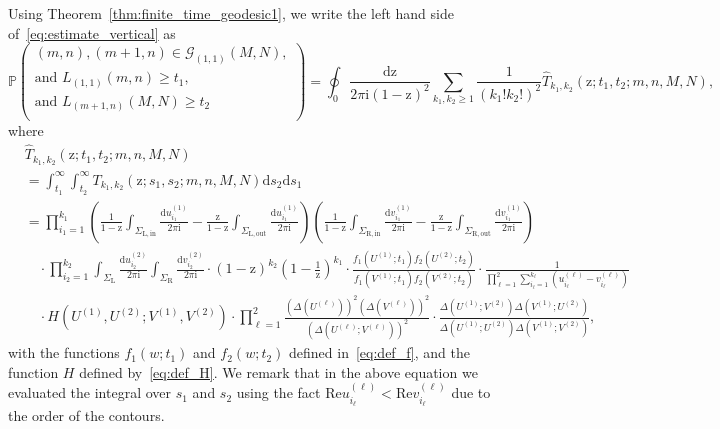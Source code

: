 \documentclass{article}
\numberwithin{equation}{section}
\newcommand{\ddbar}[2]{\frac{{\mathrm d}#1}{2\pi {\mathrm i}#2}}
\newcommand{\gd}{{\mathcal{G}}}
\newcommand{\inn}{\mathrm{in}}
\newcommand{\LL}{\mathrm{L}}
\newcommand{\out}{\mathrm{out}}
\newcommand{\prob}{\mathbb{P}}
\newcommand{\RR}{\mathrm{R}}
\begin{document}
Using Theorem~\ref{thm:finite_time_geodesic1}, we write the left hand side of~\eqref{eq:estimate_vertical} as
\begin{equation}
	\label{eq:left_vertical}
	\prob
	\left(
	\begin{array}{l}
		(m,n), (m+1,n)\in \gd_{(1,1)}{(M,N)},\\
		\mbox{and }L_{(1,1)}(m,n)\ge t_1, \\
		\mbox{and } L_{(m+1,n)}(M,N)\ge t_2\\
	\end{array}
	\right)=\oint_0\ddbar{\mathrm{z}}{\mathrm{(1-z)^2}}\sum_{k_1,k_2\ge 1}
	\frac{1}{(k_1!k_2!)^2}
	\hat T_{k_1,k_2}(\mathrm{z};t_1,t_2;m,n,M,N),
\end{equation}
where
\begin{equation}
	\label{eq:hat_T}
	\begin{split}
	&\hat T_{k_1,k_2}(\mathrm{z};t_1,t_2;m,n,M,N)\\
	&=\int_{t_1}^\infty\int_{t_2}^\infty T_{k_1,k_2}(\mathrm{z};s_1,s_2;m,n,M,N)\mathrm{d}s_2\mathrm{d}s_1\\
	&=
	\prod_{i_1=1}^{k_1}     
	\left(  \frac{1}{1-\mathrm{z}} \int_{\Sigma_{\LL,\inn}} 	    
	\ddbar{u^{(1)}_{i_1}}{}   
	-\frac{\mathrm{z}}{1-\mathrm{z}} \int_{\Sigma_{\LL,\out}} \ddbar{u^{(1)}_{i_1}}{}
	\right)
	\left(  \frac{1}{1-\mathrm{z}}  \int_{\Sigma_{\RR,\inn}}  
	\ddbar{v^{(1)}_{i_1}}{}
	-\frac{\mathrm{z}}{1-\mathrm{z}}   \int_{\Sigma_{\RR,\out}}
	\ddbar{v^{(1)}_{i_1}}{}
	\right)
	\\
	&\quad \cdot 
	\prod_{i_2=1}^{k_2}  
	\int_{\Sigma_\LL} \ddbar{u^{(2)}_{i_2}}{} 
	\int_{\Sigma_\RR} \ddbar{v^{(2)}_{i_2}}{} 
	\cdot    
	\left(1-\mathrm{z}\right)^{k_2}
	\left(1-\frac{1}{\mathrm{z}}\right)^{k_1}
	\cdot 
	\frac{f_1(U^{(1)};t_1)f_2(U^{(2)};t_2)}{f_1(V^{(1)};t_1)f_2(V^{(2)};t_2)}
	\cdot \frac{1}{\prod_{\ell=1}^2\sum_{i_\ell=1}^{k_\ell}(u_{i_\ell}^{(\ell)} -v_{i_\ell}^{(\ell)})}
	\\
	&\quad \cdot H(U^{(1)},U^{(2)};V^{(1)},V^{(2)})\cdot 
	\prod_{\ell=1}^2
	\frac{\left( \Delta(U^{(\ell)}) \right)^2
		\left( \Delta(V^{(\ell)}) \right)^2
	}
	{\left( \Delta(U^{(\ell)}; V^{(\ell)}) \right)^2}
	\cdot 
	\frac{\Delta(U^{(1)};V^{(2)})\Delta(V^{(1)};U^{(2)})}
	{\Delta(U^{(1)};U^{(2)})\Delta(V^{(1)};V^{(2)})},
	\end{split}
\end{equation}
with the functions $f_1(w;t_1)$ and $f_2(w;t_2)$ defined in~\eqref{eq:def_f}, and the function $H$ defined by~\eqref{eq:def_H}. We remark that in the above equation we evaluated the integral over $s_1$ and $s_2$ using the fact $\mathrm{Re} u_{i_\ell}^{(\ell)}<\mathrm{Re} v_{i_\ell}^{(\ell)}$ due to the order of the contours.%
\end{document}
